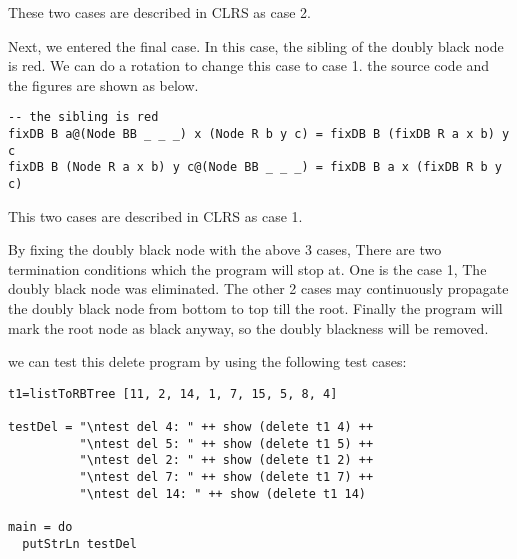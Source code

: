 \documentclass{article}
\begin{document}

These two cases are described in CLRS as case 2.

Next, we entered the final case. In this case, the sibling of the doubly black node is red.
We can do a rotation to change this case to case 1. the source code and the figures are shown
as below.

\begin{lstlisting}
-- the sibling is red
fixDB B a@(Node BB _ _ _) x (Node R b y c) = fixDB B (fixDB R a x b) y c
fixDB B (Node R a x b) y c@(Node BB _ _ _) = fixDB B a x (fixDB R b y c)
\end{lstlisting}


This two cases are described in CLRS as case 1.

By fixing the doubly black node with the above 3 cases, There are two termination conditions
which the program will stop at. One is the case 1, The doubly black node was eliminated. The
other 2 cases may continuously propagate the doubly black node from bottom to top till the root.
Finally the program will mark the root node as black anyway, so the doubly blackness will be
removed.

we can test this delete program by using the following test cases:

\begin{lstlisting}
t1=listToRBTree [11, 2, 14, 1, 7, 15, 5, 8, 4]

testDel = "\ntest del 4: " ++ show (delete t1 4) ++
          "\ntest del 5: " ++ show (delete t1 5) ++
          "\ntest del 2: " ++ show (delete t1 2) ++
          "\ntest del 7: " ++ show (delete t1 7) ++
          "\ntest del 14: " ++ show (delete t1 14)

main = do
  putStrLn testDel
\end{lstlisting}
\end{document}
